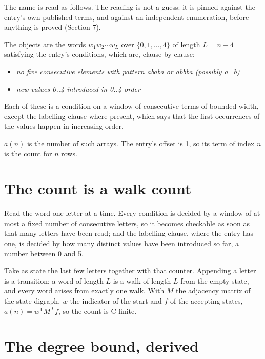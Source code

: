 \documentclass[11pt]{article}
\theoremstyle{definition}
\begin{document}
The name is read as follows. The reading is not a guess: it is pinned against the entry's own published terms, and against an independent enumeration, before anything is proved (Section 7).

The objects are the words $w_1 w_2 \cdots w_L$ over $\{0,1,\dots,4\}$ of length $L = n + 4$ satisfying the entry's conditions, which are, clause by clause:

\begin{itemize}

\item {\itshape no five consecutive elements with pattern ababa or abbba (possibly a=b)}

\item {\itshape new values 0..4 introduced in 0..4 order}

\end{itemize}

Each of these is a condition on a window of consecutive terms of bounded width, except the labelling clause where present, which says that the first occurrences of the values happen in increasing order.

$a(n)$ is the number of such arrays. The entry's offset is 1, so its term of index $n$ is the count for $n$ rows.

\section{The count is a walk count}

Read the word one letter at a time. Every condition is decided by a window of at most a fixed number of consecutive letters, so it becomes checkable as soon as that many letters have been read; and the labelling clause, where the entry has one, is decided by how many distinct values have been introduced so far, a number between $0$ and 5.

Take as state the last few letters together with that counter. Appending a letter is a transition; a word of length $L$ is a walk of length $L$ from the empty state, and every word arises from exactly one walk. With $M$ the adjacency matrix of the state digraph, $w$ the indicator of the start and $f$ of the accepting states, $a(n) = w^{\mathsf T}M^{\,L}f$, so the count is C-finite.

\section{The degree bound, derived}
\end{document}
